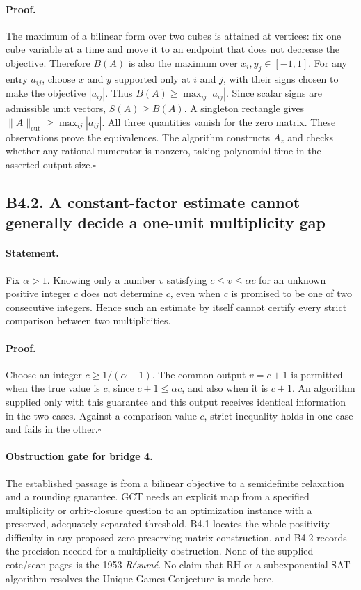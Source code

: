 \documentclass[11pt,a4paper]{article}
\begin{document}
\paragraph{Proof.}
The maximum of a bilinear form over two cubes is attained at vertices:
fix one cube variable at a time and move it to an endpoint that does not
decrease the objective.  Therefore $B(A)$ is also the maximum over
$x_i,y_j\in[-1,1]$.  For any entry $a_{ij}$, choose $x$ and $y$ supported
only at $i$ and $j$, with their signs chosen to make the objective
$|a_{ij}|$.  Thus $B(A)\geq\max_{ij}|a_{ij}|$.
Since scalar signs are admissible unit vectors, $S(A)\geq B(A)$.
A singleton rectangle gives
$\|A\|_{\mathrm{cut}}\geq\max_{ij}|a_{ij}|$.
All three quantities vanish for the zero matrix.  These observations
prove the equivalences.  The algorithm constructs $A_z$ and checks
whether any rational numerator is nonzero, taking polynomial time in
the asserted output size.\hfill$\square$

\subsection*{B4.2. A constant-factor estimate cannot generally decide a one-unit multiplicity gap}
\paragraph{Statement.}
Fix $\alpha>1$.  Knowing only a number $v$ satisfying
$c\leq v\leq\alpha c$ for an unknown positive integer $c$ does not
determine $c$, even when $c$ is promised to be one of two consecutive
integers.  Hence such an estimate by itself cannot certify every strict
comparison between two multiplicities.
\paragraph{Proof.}
Choose an integer $c\geq1/(\alpha-1)$.  The common output $v=c+1$
is permitted when the true value is $c$, since
$c+1\leq\alpha c$, and also when it is $c+1$.  An algorithm supplied
only with this guarantee and this output receives identical information
in the two cases.  Against a comparison value $c$, strict inequality
holds in one case and fails in the other.\hfill$\square$

\paragraph{Obstruction gate for bridge 4.}
The established passage is from a bilinear objective to a semidefinite
relaxation and a rounding guarantee.  GCT needs an explicit map from a
specified multiplicity or orbit-closure question to an optimization
instance with a preserved, adequately separated threshold.  B4.1 locates
the whole positivity difficulty in any proposed zero-preserving
matrix construction, and B4.2 records the precision needed for a
multiplicity obstruction.  None of the supplied cote/scan pages is the
1953 \emph{R\'esum\'e}.  No claim that RH or a subexponential SAT
algorithm resolves the Unique Games Conjecture is made here.
\end{document}
